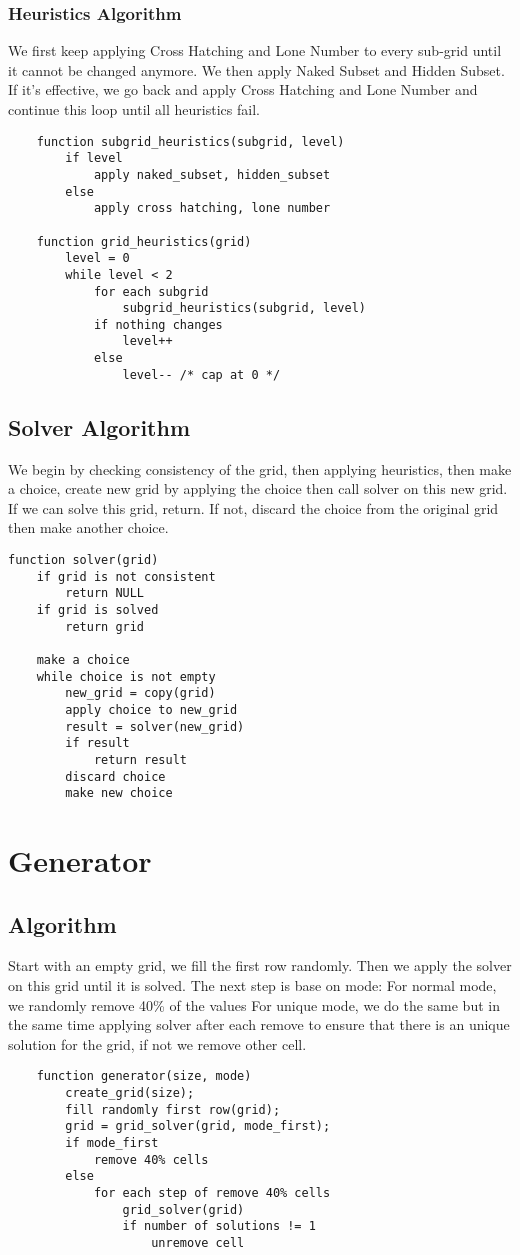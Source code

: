 \documentclass{article}
\begin{document}
\subsubsection{Heuristics Algorithm}
We first keep applying Cross Hatching and Lone Number to every sub-grid until it cannot be changed anymore. We then apply Naked Subset and Hidden Subset. If it's effective, we go back and apply Cross Hatching and Lone Number and continue this loop until all heuristics fail.
\begin{lstlisting}
    function subgrid_heuristics(subgrid, level)
        if level
            apply naked_subset, hidden_subset
        else
            apply cross hatching, lone number

    function grid_heuristics(grid)
        level = 0
        while level < 2
            for each subgrid
                subgrid_heuristics(subgrid, level)
            if nothing changes
                level++
            else
                level-- /* cap at 0 */
\end{lstlisting}
\subsection{Solver Algorithm}
We begin by checking consistency of the grid, then applying heuristics, then make a choice, create new grid by applying the choice then call solver on this new grid. If we can solve this grid, return. If not, discard the choice from the original grid then make another choice.
\begin{lstlisting}
function solver(grid)
    if grid is not consistent
        return NULL
    if grid is solved
        return grid

    make a choice
    while choice is not empty
        new_grid = copy(grid)
        apply choice to new_grid
        result = solver(new_grid)
        if result
            return result
        discard choice
        make new choice
\end{lstlisting}
\section{Generator}
\subsection{Algorithm}
Start with an empty grid, we fill the first row randomly. Then we apply the solver on this grid until it is solved. The next step is base on mode: For normal mode, we randomly remove 40\% of the values For unique mode, we do the same but in the same time applying solver after each remove to ensure that there is an unique solution for the grid, if not we remove other cell.
\begin{lstlisting}
    function generator(size, mode)
        create_grid(size);
        fill randomly first row(grid);
        grid = grid_solver(grid, mode_first);
        if mode_first
            remove 40% cells
        else
            for each step of remove 40% cells
                grid_solver(grid)
                if number of solutions != 1
                    unremove cell
\end{lstlisting}
\end{document}
